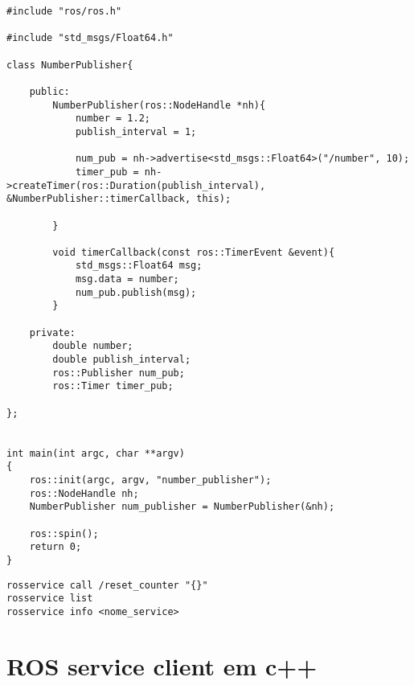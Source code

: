 \documentclass[letterpaper]{article}
\begin{document}
\begin{lstlisting}[style=cppStyle, title=number\_publisher.cpp] 
#include "ros/ros.h"

#include "std_msgs/Float64.h" 

class NumberPublisher{                             

    public:
        NumberPublisher(ros::NodeHandle *nh){      
            number = 1.2;
            publish_interval = 1;

            num_pub = nh->advertise<std_msgs::Float64>("/number", 10);
            timer_pub = nh->createTimer(ros::Duration(publish_interval), &NumberPublisher::timerCallback, this);

        }

        void timerCallback(const ros::TimerEvent &event){
            std_msgs::Float64 msg;
            msg.data = number;
            num_pub.publish(msg);
        }

    private:
        double number;
        double publish_interval;
        ros::Publisher num_pub;
        ros::Timer timer_pub;

};


int main(int argc, char **argv)
{
    ros::init(argc, argv, "number_publisher");     
    ros::NodeHandle nh;
    NumberPublisher num_publisher = NumberPublisher(&nh);     
    
    ros::spin();
    return 0;
}

\end{lstlisting}


\begin{lstlisting}[style=bashStyle, title=ROSservice terminal] 
rosservice call /reset_counter "{}" 
rosservice list
rosservice info <nome_service>

\end{lstlisting}

\section{ROS service client em c++}
\end{document}
